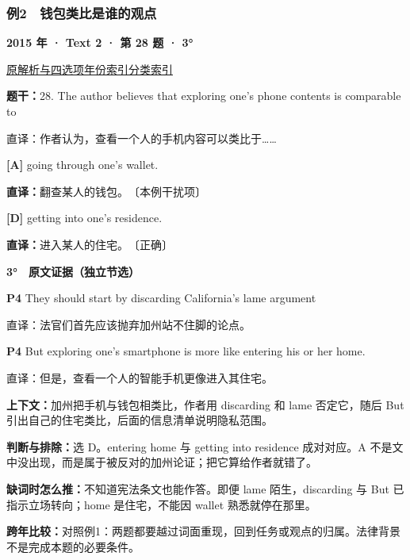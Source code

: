 \documentclass[11pt,a4paper]{article}
\begin{document}
\subsubsection{例2　钱包类比是谁的观点}\label{case-2015-T2-Q28}
\noindent\textbf{2015 年 · Text 2 · 第 28 题 · 3°}\par\noindent \href{https://zj139.github.io/math-notes/english/1d136f1c0a2cc3e255b39ab4/\#q28}{原解析与四选项}\quad \hyperref[idx-2015-T2-Q28]{年份索引}\quad \hyperref[class-R01]{分类索引}\par\smallskip
\noindent\textbf{题干：}28. The author believes that exploring one's phone contents is comparable to\par
直译：作者认为，查看一个人的手机内容可以类比于……\par
{}\noindent\textbf{[A]} going through one's wallet.\par\nopagebreak
\noindent\textbf{直译：}翻查某人的钱包。　〔本例干扰项〕\par
{}\noindent\textbf{[D]} getting into one's residence.\par\nopagebreak
\noindent\textbf{直译：}进入某人的住宅。　〔正确〕\par
\begin{evidence}\textbf{3°　原文证据（独立节选）}\par
\textbf{P4} They should start by discarding California's lame argument\par 直译：法官们首先应该抛弃加州站不住脚的论点。\par
\textbf{P4} But exploring one's smartphone is more like entering his or her home.\par 直译：但是，查看一个人的智能手机更像进入其住宅。\par
\end{evidence}
\noindent\textbf{上下文：}加州把手机与钱包相类比，作者用 discarding 和 lame 否定它，随后 But 引出自己的住宅类比，后面的信息清单说明隐私范围。\par
\noindent\textbf{判断与排除：}选 D。entering home 与 getting into residence 成对对应。A 不是文中没出现，而是属于被反对的加州论证；把它算给作者就错了。\par
\noindent\textbf{缺词时怎么推：}不知道宪法条文也能作答。即便 lame 陌生，discarding 与 But 已指示立场转向；home 是住宅，不能因 wallet 熟悉就停在那里。\par
\noindent\textbf{跨年比较：}对照例1：两题都要越过词面重现，回到任务或观点的归属。法律背景不是完成本题的必要条件。\par
\clearpage
\end{document}
